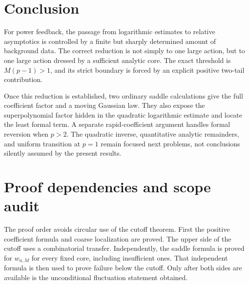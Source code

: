 \documentclass[11pt,a4paper]{article}
\numberwithin{equation}{section}
\theoremstyle{definition}
\theoremstyle{remark}
\begin{document}
\section{Conclusion}

For power feedback, the passage from logarithmic estimates to relative
asymptotics is controlled by a finite but sharply determined amount of
background data. The correct reduction is not simply to one large action,
but to one large action dressed by a sufficient analytic core. The exact
threshold is $M(p-1)>1$, and its strict boundary is forced by an explicit
positive two-tail contribution.

Once this reduction is established, two ordinary saddle calculations give
the full coefficient factor and a moving Gaussian law. They also expose the
superpolynomial factor hidden in the quadratic logarithmic estimate and
locate the least formal term. A separate rapid-coefficient argument handles
formal reversion when $p>2$. The quadratic inverse, quantitative analytic
remainders, and uniform transition at $p=1$ remain focused next problems,
not conclusions silently assumed by the present results.

\appendix
\section{Proof dependencies and scope audit}
\label{app:audit}

The proof order avoids circular use of the cutoff theorem. First the positive
coefficient formula and coarse localization are proved. The upper side of
the cutoff uses a combinatorial transfer. Independently, the saddle formula
is proved for $w_{n,M}$ for every fixed core, including insufficient ones.
That independent formula is then used to prove failure below the cutoff.
Only after both sides are available is the unconditional fluctuation
statement obtained.
\end{document}
